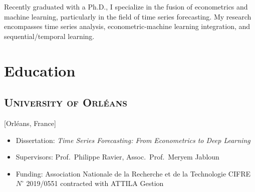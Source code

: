 \documentclass{mycv}
\begin{document}
\maketitle




\begin{summary}
  Recently graduated with a Ph.D., I specialize in the fusion of econometrics and machine learning, particularly in the field of time series forecasting. My research encompasses time series analysis, econometric-machine learning integration, and sequential/temporal learning.
\end{summary}

\vspace{-1em}

\section{Education}

\subsection{\large \scshape University of Orl\'eans}[Orl\'eans, France]

\begin{positions}
\end{positions}


\begin{itemize}
  \itemsep 0em
  \item Dissertation: \textit{Time Series Forecasting: From Econometrics to Deep Learning}
  \item Supervisors: Prof.~Philippe Ravier, Assoc.~Prof.~Meryem Jabloun
  \item Funding: Association Nationale de la Recherche et de la Technologie CIFRE $N^{\circ}$ 2019/0551 contracted with ATTILA Gestion
\end{itemize}
\end{document}

